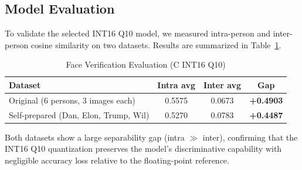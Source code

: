 \subsection{Model Evaluation}

To validate the selected INT16 Q10 model, we measured intra-person and
inter-person cosine similarity on two datasets. Results are summarized in
Table~\ref{tab:eval}.

\begin{table}[H]
\centering
\caption{Face Verification Evaluation (C INT16 Q10)}
\label{tab:eval}
\begin{tabular}{lccc}
\toprule
\textbf{Dataset} & \textbf{Intra avg} & \textbf{Inter avg} & \textbf{Gap} \\
\midrule
Original (6 persons, 3 images each)   & 0.5575 & 0.0673 & \textbf{+0.4903} \\
Self-prepared (Dan, Elon, Trump, Wil) & 0.5270 & 0.0783 & \textbf{+0.4487} \\
\bottomrule
\end{tabular}
\end{table}

Both datasets show a large separability gap (intra $\gg$ inter), confirming
that the INT16 Q10 quantization preserves the model's discriminative capability
with negligible accuracy loss relative to the floating-point reference.